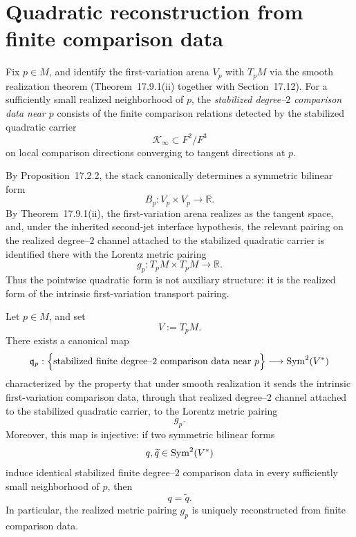 \section{Quadratic reconstruction from finite comparison data}
\label{sec:einstein-quadratic-reconstruction}
\begin{definition}
	Fix \(p\in M\), and identify the first-variation arena \(V_p\) with
	\(T_pM\) via the smooth realization theorem
	\textup{(Theorem~17.9.1(ii) together with Section~17.12)}.
	For a sufficiently small realized neighborhood of \(p\), the
	\emph{stabilized degree--\(2\) comparison data near \(p\)} consists of the
	finite comparison relations detected by the stabilized quadratic carrier
	\[
		\mathcal K_\infty\subset F^2/F^3
	\]
	on local comparison directions converging to tangent directions at \(p\).
\end{definition}
\begin{remark}
	By Proposition~17.2.2, the stack canonically determines a symmetric
	bilinear form
	\[
		B_p:V_p\times V_p\to\mathbb R.
	\]
	By Theorem~17.9.1(ii), the first-variation arena realizes as the
	tangent space, and, under the inherited second-jet interface
	hypothesis, the relevant pairing on the realized degree--\(2\)
	channel attached to the stabilized quadratic carrier is identified
	there with the Lorentz metric pairing
	\[
		g_p:T_pM\times T_pM\to\mathbb R.
	\]
	Thus the pointwise quadratic form is not auxiliary structure: it is the
	realized form of the intrinsic first-variation transport pairing.
\end{remark}
\begin{theorem}
	\label{thm:einstein-quadratic-reconstruction}
	Let \(p\in M\), and set
	\[
		V:=T_pM.
	\]
	There exists a canonical map
	\[
		\mathfrak q_p:
		\Bigl\{
		\text{stabilized finite degree--\(2\) comparison data near }p
		\Bigr\}
		\longrightarrow
		\operatorname{Sym}^2(V^*)
	\]
	characterized by the property that under smooth realization it sends
	the intrinsic first-variation comparison data, through that realized
	degree--\(2\) channel attached to the stabilized quadratic carrier,
	to the Lorentz metric pairing
	\[
		g_p.
	\]
	Moreover, this map is injective: if two symmetric bilinear forms
	\[
		q,\widetilde q\in \operatorname{Sym}^2(V^*)
	\]
	induce identical stabilized finite degree--\(2\) comparison data in every
	sufficiently small neighborhood of \(p\), then
	\[
		q=\widetilde q.
	\]
	In particular, the realized metric pairing \(g_p\) is uniquely
	reconstructed from finite comparison data.
\end{theorem}
